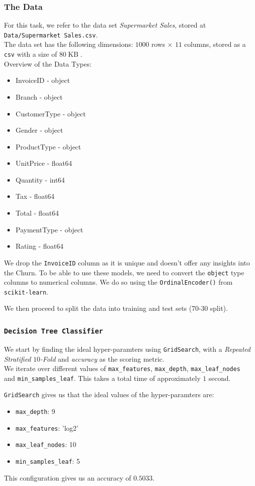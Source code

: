 \documentclass{article}
\begin{document}
\subsubsection{The Data}
    For this task, we refer to the data set \textit{Supermarket Sales}, stored at \verb|Data/Supermarket Sales.csv|. \\
    The data set has the following dimensions: $1000$ rows $\times$ $11$ columns, stored as a \verb|csv| with a size of $80 \operatorname{KB}$. \\
    Overview of the Data Types:
    \begin{itemize}
        \item InvoiceID - object
        \item Branch - object
        \item CustomerType - object
        \item Gender - object
        \item ProductType - object
        \item UnitPrice - float64
        \item Quantity - int64
        \item Tax - float64
        \item Total - float64
        \item PaymentType - object
        \item Rating - float64
    \end{itemize}
    We drop the \verb|InvoiceID| column as it is unique and doesn't offer any insights into the Churn.
    To be able to use these models, we need to convert the \verb|object| type columns to numerical columns. We do so using the \verb|OrdinalEncoder()| from \verb|scikit-learn|. 

    We then proceed to split the data into training and test sets ($70$-$30$ split).

\subsubsection{\texttt{Decision Tree Classifier}}
    We start by finding the ideal hyper-paramters using \verb|GridSearch|, with a \textit{Repeated Stratified $10$-Fold} and \textit{accuracy} as the scoring metric. \\
    We iterate over different values of \verb|max_features|, \verb|max_depth|, \verb|max_leaf_nodes| and \verb|min_samples_leaf|. This takes a total time of approximately $1$ second.

    \verb|GridSearch| gives us that the ideal values of the hyper-paramters are:
    \begin{itemize}
        \item \verb|max_depth|: 9
        \item \verb|max_features|: 'log2'
        \item \verb|max_leaf_nodes|: 10
        \item \verb|min_samples_leaf|: 5
    \end{itemize}
    This configuration gives us an accuracy of $0.5033$.
\end{document}
